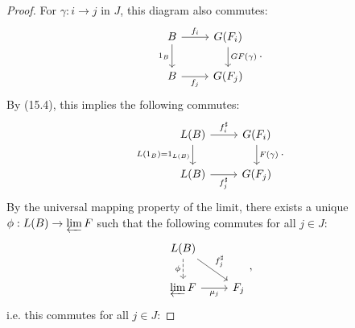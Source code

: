 \documentclass[12pt]{article}
\begin{document}
\begin{proof}
	For $\gamma: i\to j$ in $J$, this diagram also commutes:
	\begin{equation*}
\begin{tikzcd}
B \arrow[r, "f_i"] \arrow[d, "1_B"'] & G(F_i) \arrow[d, "GF(\gamma)"] \\
B \arrow[r, "f_j"']                  & G(F_j)                        
\end{tikzcd}.
	\end{equation*}
	By (15.4), this implies the following commutes:
	\begin{equation*}
\begin{tikzcd}
L(B) \arrow[r, "f_i^\sharp"] \arrow[d, "L(1_B)=1_{L(B)}"'] & G(F_i) \arrow[d, "F(\gamma)"] \\
L(B) \arrow[r, "f_j^\sharp"']                              & G(F_j)                       
\end{tikzcd}.
	\end{equation*}
	By the universal mapping property of the limit, there exists a unique $\phi:L(B)\to\varprojlim F$ such that the following commutes for all $j\in J$:
	\begin{equation*}
\begin{tikzcd}
L(B) \arrow[rd, "f_j^\sharp"] \arrow[d, "\phi"', dashed] &     \\
\varprojlim F \arrow[r, "\mu_j"']                        & F_j
\end{tikzcd},
	\end{equation*}
	i.e. this commutes for all $j\in J$:

\end{proof}
\end{document}
